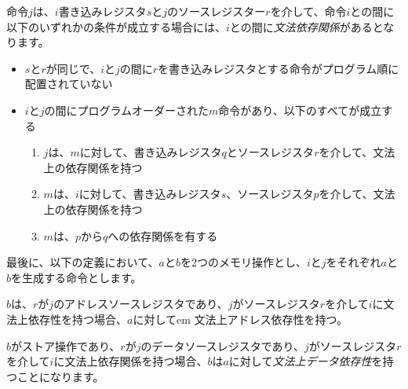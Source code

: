 命令$j$は、$i$書き込みレジスタ$s$と$j$のソースレジスター$r$を介して、命令$i$との間に以下のいずれかの条件が成立する場合には、$i$との間に{\em 文法依存関係}があるとなります。
\begin{itemize}
  \item $s$と$r$が同じで、$i$と$j$の間に$r$を書き込みレジスタとする命令がプログラム順に配置されていない
  \item $i$と$j$の間にプログラムオーダーされた$m$命令があり、以下のすべてが成立する
  \begin{enumerate}
    \item $j$は、$m$に対して、書き込みレジスタ$q$とソースレジスタ$r$を介して、文法上の依存関係を持つ
    \item $m$は、$i$に対して、書き込みレジスタ$s$、ソースレジスタ$p$を介して、文法上の依存関係を持つ
    \item $m$は、$p$から$q$への依存関係を有する
  \end{enumerate}
\end{itemize}

\begin{comment}
Finally, in the definitions that follow, let $a$ and $b$ be two memory operations, and let $i$ and $j$ be the instructions that generate $a$ and $b$, respectively.
\end{comment}

最後に、以下の定義において、$a$と$b$を2つのメモリ操作とし、$i$と$j$をそれぞれ$a$と$b$を生成する命令とします。

\begin{comment}
$b$ has a {\em syntactic address dependency} on $a$ if $r$ is an address source register for $j$ and $j$ has a syntactic dependency on $i$ via source register $r$
\end{comment}

$b$は、$r$が$j$のアドレスソースレジスタであり、$j$がソースレジスタ$r$を介して$i$に文法上依存性を持つ場合、$a$に対して{em 文法上アドレス依存性}を持つ。

\begin{comment}
$b$ has a {\em syntactic data dependency} on $a$ if $b$ is a store operation, $r$ is a data source register for $j$, and $j$ has a syntactic dependency on $i$ via source register $r$
\end{comment}

$b$がストア操作であり、$r$が$j$のデータソースレジスタであり、$j$がソースレジスタ$r$を介して$i$に文法上依存関係を持つ場合、$b$は$a$に対して{\em 文法上データ依存性}を持つことになります。

